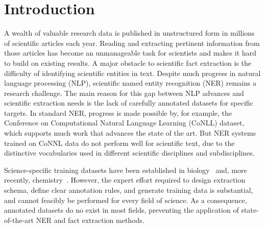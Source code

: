 \section{Introduction}
\label{sect:apner_introduction}
A wealth of valuable research data is published in unstructured form in millions of scientific articles each year. %
Reading and extracting pertinent information from those articles has
become an unmanageable task for scientists and makes
it hard to build on existing results. 
A major obstacle to scientific fact extraction is the difficulty of identifying scientific entities in text.
Despite much progress in natural language processing (NLP), 
scientific named entity recognition (NER) remains a research challenge.
The main reason for this gap between NLP advances and scientific extraction needs is the lack of carefully annotated datasets for specific targets.
In standard NER, 
progress is made possible by, for example, the 
Conference on Computational Natural Language Learning (CoNLL) dataset,
which supports much work that advances the state of the art.
But NER systems trained on CoNNL data do not perform well for scientific text, due to 
the distinctive vocabularies used in different scientific disciplines and subdisciplines.

Science-specific training datasets have been established in
biology~\cite{song2004posbiotm} and, more recently, chemistry~\cite{krallinger2015chemdner}.
However, the expert effort required to 
design 
extraction schema, 
define clear annotation rules, and generate training data %
is substantial, and cannot feasibly be performed for 
every field of science.
As a consequence, annotated datasets do no exist in most fields,
preventing the application of state-of-the-art NER and fact extraction methods.

